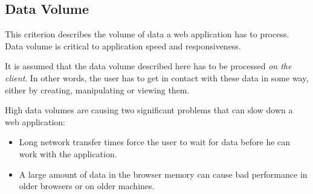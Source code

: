 \subsection{Data Volume} %
\label{sec:datavolume}
This criterion describes the volume of data a web application has to process. Data volume is critical to application speed and responsiveness.

It is assumed that the data volume described here has to be processed \emph{on the client}. In other words, the user has to get in contact with these data in some way, either by creating, manipulating or viewing them.

High data volumes are causing two significant problems that can slow down a web application:
\begin{itemize}
	\item Long network transfer times force the user to wait for data before he can work with the application. 
	\item A large amount of data in the browser memory can cause bad performance in older browsers or on older machines.
\end{itemize}

